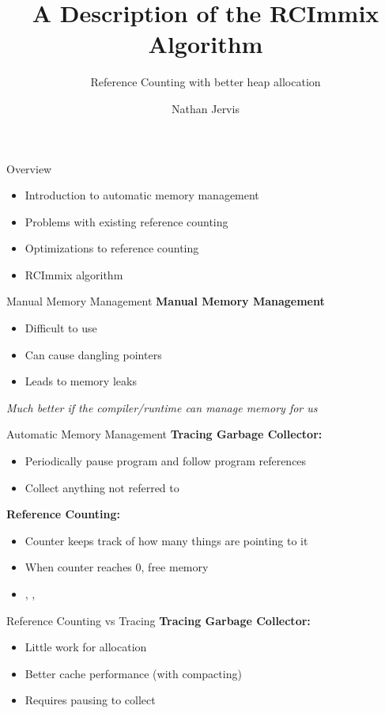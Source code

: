 \documentclass{beamer}
\title[RCImmix]{A Description of the RCImmix Algorithm}
\subtitle[RC]{Reference Counting with better heap allocation}
\author[N. Jervis]{Nathan Jervis}
\institute[McMaster]{
  Department of Computer Science\\
  McMaster University, Hamilton\\
  \texttt{jervisnd@mcmaster.ca}\\
  \texttt{1211159}
}
\begin{document}
\begin{frame}[plain]
  \titlepage
\end{frame}

\begin{frame}{Overview}
	\begin{itemize}
		\item Introduction to automatic memory management
		\item Problems with existing reference counting
		\item Optimizations to reference counting
		\item RCImmix algorithm
	\end{itemize}
\end{frame}

\begin{frame}{Manual Memory Management}
	\textbf{Manual Memory Management}
	\begin{itemize}
		\item Difficult to use
		\item Can cause dangling pointers
		\item Leads to memory leaks
	\end{itemize}
	\emph{Much better if the compiler/runtime can manage memory for us}
\end{frame}

\begin{frame}{Automatic Memory Management}
	\textbf{Tracing Garbage Collector:}
	\begin{itemize}
		\item Periodically pause program and follow program references
		\item Collect anything not referred to
	\end{itemize}
	\textbf{Reference Counting:}
	\begin{itemize}
		\item Counter keeps track of how many things are pointing to it
		\item When counter reaches 0, free memory
		\item {}, , 
	\end{itemize}
\end{frame}

\begin{frame}{Reference Counting vs Tracing}
	\textbf{Tracing Garbage Collector:}
	\begin{itemize}
		\item Little work for allocation
		\item Better cache performance (with compacting)
		\item Requires pausing to collect
	\end{itemize}
\end{frame}
\end{document}
